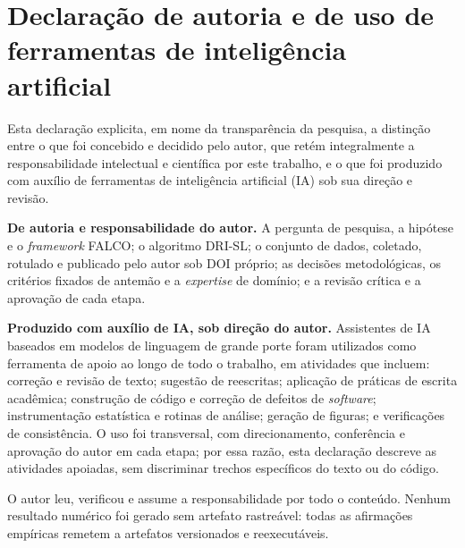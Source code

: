 \chapter*{Declaração de autoria e de uso de ferramentas de intelig\^encia artificial}

Esta declara\c{c}\~ao explicita, em nome da transpar\^encia da pesquisa, a
distin\c{c}\~ao entre o que foi concebido e decidido pelo autor, que ret\'em
integralmente a responsabilidade intelectual e cient\'ifica por este
trabalho, e o que foi produzido com aux\'ilio de ferramentas de
intelig\^encia artificial (IA) sob sua dire\c{c}\~ao e revis\~ao.

\vspace{0.5em}
\noindent\textbf{De autoria e responsabilidade do autor.} A pergunta de
pesquisa, a hip\'otese e o \textit{framework} FALCO; o algoritmo DRI-SL; o
conjunto de dados, coletado, rotulado e publicado pelo autor sob DOI
pr\'oprio; as decis\~oes metodol\'ogicas, os crit\'erios fixados de
antem\~ao e a \textit{expertise} de dom\'inio; e a revis\~ao cr\'itica e a
aprova\c{c}\~ao de cada etapa.

\vspace{0.5em}
\noindent\textbf{Produzido com aux\'ilio de IA, sob dire\c{c}\~ao do autor.}
Assistentes de IA baseados em modelos de linguagem de grande porte foram
utilizados como ferramenta de apoio ao longo de todo o trabalho, em
atividades que incluem: corre\c{c}\~ao e revis\~ao de texto; sugest\~ao de
reescritas; aplica\c{c}\~ao de pr\'aticas de escrita acad\^emica;
constru\c{c}\~ao de c\'odigo e corre\c{c}\~ao de defeitos de
\textit{software}; instrumenta\c{c}\~ao estat\'istica e rotinas de
an\'alise; gera\c{c}\~ao de figuras; e verifica\c{c}\~oes de
consist\^encia. O uso foi transversal, com direcionamento, confer\^encia e
aprova\c{c}\~ao do autor em cada etapa; por essa raz\~ao, esta
declara\c{c}\~ao descreve as atividades apoiadas, sem discriminar trechos
espec\'ificos do texto ou do c\'odigo.

\vspace{0.5em}
\noindent O autor leu, verificou e assume a responsabilidade por todo o
conte\'udo. Nenhum resultado num\'erico foi gerado sem artefato
rastre\'avel: todas as afirma\c{c}\~oes emp\'iricas remetem a artefatos
versionados e reexecut\'aveis.
